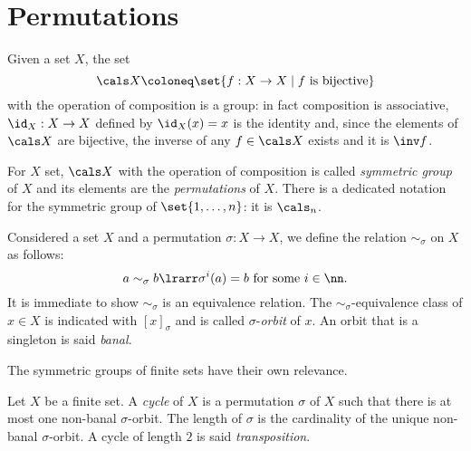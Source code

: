 
\section{Permutations}

Given a set \(X\), the set
\[\cals X \coloneq \set{f : X \to X \mid f \text{ is bijective}}\]
with the operation of composition is a group: in fact composition is associative, \(\id_X : X \to X\) defined by \(\id_X(x) = x\) is the identity and, since the elements of \(\cals X\) are bijective, the inverse of any \(f \in \cals X\) exists and it is \(\inv f\).

\begin{definition}
For \(X\) set, \(\cals X\) with the operation of composition is called {\em symmetric group} of \(X\) and its elements are the {\em permutations} of \(X\). There is a dedicated notation for the symmetric group of \(\set{1, \dots{}, n}\): it is \(\cals_n\).
\end{definition}

Considered a set \(X\) and a permutation \(\sigma : X \to X\), we define the relation \(\sim_\sigma\) on \(X\) as follows:
\[a \sim_\sigma b \lrarr \sigma^i(a) = b \text{ for some } i \in \nn.\]
It is immediate to show \(\sim_\sigma\) is an equivalence relation. The \(\sim_\sigma\)-equivalence class of \(x \in X\) is indicated with \([x]_\sigma\) and is called \(\sigma\)-{\em orbit} of \(x\). An orbit that is a singleton is said {\em banal}.

The symmetric groups of finite sets have their own relevance.%

\begin{definition}
Let \(X\) be a finite set. A {\em cycle} of \(X\) is a permutation \(\sigma\) of \(X\) such that there is at most one non-banal \(\sigma\)-orbit. The length of \(\sigma\) is the cardinality of the unique non-banal \(\sigma\)-orbit. A cycle of length \(2\) is said {\em transposition}.
\end{definition}


